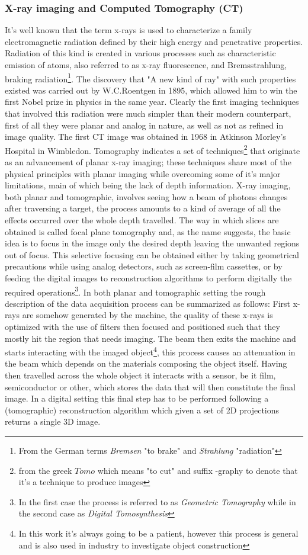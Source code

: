 \subsubsection{X-ray imaging and Computed Tomography (CT)}
It's well known that the term x-rays is used to characterize a family electromagnetic radiation defined by their high energy and penetrative properties. Radiation of this kind is created in various processes such as characteristic emission of atoms, also referred to as x-ray fluorescence, and Bremsstrahlung, braking radiation\footnote{From the German terms \textit{Bremsen} "to brake" and \textit{Strahlung} "radiation"}. The discovery that "A new kind of ray"\cite{Roentgen} with such properties existed was carried out by W.C.Roentgen in 1895, which allowed him to win the first Nobel prize in physics in the same year. Clearly the first imaging techniques that involved this radiation were much simpler than their modern counterpart, first of all they were planar and analog in nature, as well as not as refined in image quality. The first CT image was obtained in 1968 in Atkinson Morley's Hospital in Wimbledon. Tomography indicates a set of techniques\footnote{from the greek $\textit{Tomo}$ which means "to cut" and suffix -graphy to denote that it's a technique to produce images} that originate as an advancement of planar x-ray imaging; these techniques share most of the physical principles with planar imaging while overcoming some of it's major limitations, main of which being the lack of depth information.  X-ray imaging, both planar and tomographic, involves seeing how a beam of photons changes after traversing a target, the process amounts to a kind of average of all the effects occurred over the whole depth travelled. 
The way in which slices are obtained is called focal plane tomography and, as the name suggests, the basic idea is to focus in the image only the desired depth leaving the unwanted regions out of focus. This selective focusing can be obtained either by taking geometrical precautions while using analog detectors, such as screen-film cassettes, or by feeding the digital images to reconstruction algorithms to perform digitally the required operations\footnote{In the first case the process is referred to as \textit{Geometric Tomography} while in the second case as \textit{Digital Tomosynthesis}}.
In both planar and tomographic setting the rough description of the data acquisition process can be summarized as follows: First x-rays are somehow generated by the machine, the quality of these x-rays is optimized with the use of filters then focused and positioned such that they mostly hit the region that needs imaging. The beam then exits the machine and starts interacting with the imaged object\footnote{In this work it's always going to be a patient, however this process is general and is also used in industry to investigate object construction}, this process causes an attenuation in the beam which depends on the materials composing the object itself. Having then travelled across the whole object it interacts with a sensor, be it film, semiconductor or other, which stores the data that will then constitute the final image. In a digital setting this final step has to be performed following a (tomographic) reconstruction algorithm which given a set of 2D projections returns a single 3D image.
